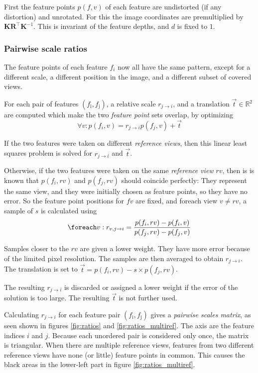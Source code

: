 \documentclass{scrreprt}
\newcommand{\matr}[1]{\mathbf{#1}}
\newcommand{\transpose}[1]{#1^\intercal}
\begin{document}
First the feature points $p(f,v)$ of each feature are undistorted (if any distortion) and unrotated. For this the image coordinates are premultiplied by $\matr{K} \transpose{\matr{R}} \matr{K}^{-1}$. This is invariant of the feature depths, and $d$ is fixed to $1$.

\subsubsection{Pairwise scale ratios}
The feature points of each feature $f_i$ now all have the same pattern, except for a different scale, a different position in the image, and a different subset of covered views.

For each pair of features $(f_\text{i}, f_\text{j})$, a relative scale $r_{j\rightarrow i}$, and a translation $\vec{t} \in \mathbb{R}^2$ are computed which make the two \emph{feature point} sets overlap, by optimizing
\begin{equation}
\forall v : p(f_i, v) = r_{j\rightarrow i} p(f_j, v) + \vec{t}
\end{equation}

If the two features were taken on different \emph{reference views}, then this linear least squares problem is solved for $r_{j\rightarrow i}$ and $\vec{t}$.

Otherwise, if the two features were taken on the same \emph{reference view} $rv$, then is is known that $p(f_i, rv)$ and $p(f_j, rv)$ should coincide perfectly: They represent the same view, and they were initially chosen as feature points, so they have no error. So the feature point positions for $fv$ are fixed, and foreach view $v \neq rv$, a sample of $s$ is calculated using
\begin{equation*}
\foreach v : r_{v,j\rightarrow i} = \frac{p(f_i, rv) - p(f_i, v)}{p(f_j, rv) - p(f_j, v)}
\end{equation*}

Samples closer to the $rv$ are given a lower weight. They have more error because of the limited pixel resolution. The samples are then averaged to obtain $r_{j\rightarrow i}$. The translation is set to $\vec{t} = p(f_i, rv) - s \times p(f_j, rv)$.

The resulting $r_{j\rightarrow i}$ is discarded or assigned a lower weight if the error of the solution is too large. The resulting $\vec{t}$ is not further used.

Calculating $r_{j\rightarrow i}$ for each feature pair $(f_\text{i}, f_\text{j})$ gives a \emph{pairwise scales matrix}, as seen shown in figures \ref{fig:ratios} and \ref{fig:ratios_multiref}. The axis are the feature indices $i$ and $j$. Because each unordered pair is considered only once, the matrix is triangular. When there are multiple reference views, features from two different reference views have none (or little) feature points in common. This causes the black areas in the lower-left part in figure \ref{fig:ratios_multiref}.
\end{document}
